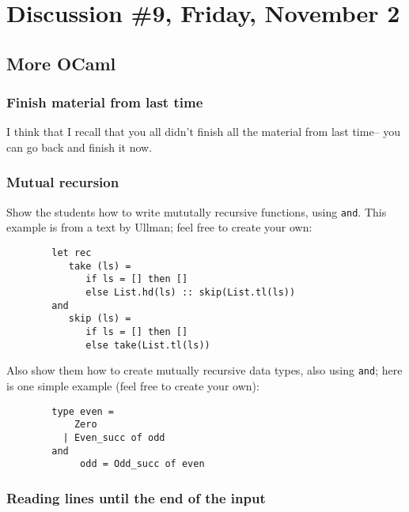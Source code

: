 \documentclass[12pt]{article}
\begin{document}

  \section{Discussion \#9, Friday, November 2}

    \subsection{More OCaml}

      \subsubsection{Finish material from last time}

        I think that I recall that you all didn't finish all the material from
      last time-- you can go back and finish it now.

      \subsubsection{Mutual recursion}

        Show the students how to write mututally recursive functions, using
      \texttt{and}.  This example is from a text by Ullman; feel free to
      create your own:

        \begin{Verbatim}
        let rec
           take (ls) =
              if ls = [] then []
              else List.hd(ls) :: skip(List.tl(ls))
        and
           skip (ls) =
              if ls = [] then []
              else take(List.tl(ls))
        \end{Verbatim}

        Also show them how to create mutually recursive data types, also
      using \texttt{and}; here is one simple example (feel free to
      create your own):

        \begin{Verbatim}
        type even =
            Zero
          | Even_succ of odd
        and
             odd = Odd_succ of even
        \end{Verbatim}

      \subsubsection{Reading lines until the end of the input}
\end{document}

